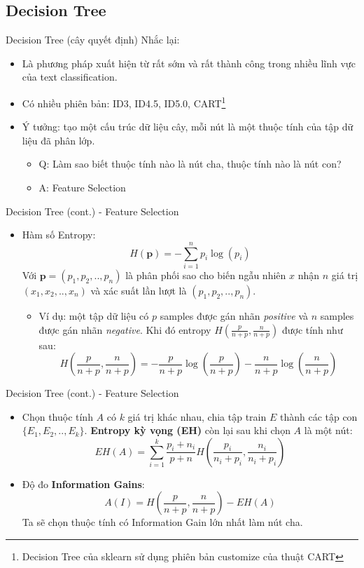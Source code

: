 \documentclass[aspectratio=169,xcolor=dvipsnames]{beamer}
\begin{document}
\subsection{Decision Tree}
\begin{frame}{Decision Tree (cây quyết định)}
Nhắc lại:
\begin{itemize}
\item Là phương pháp xuất hiện từ rất sớm và rất thành công trong nhiều lĩnh vực của text classification.
\item Có nhiều phiên bản: ID3, ID4.5, ID5.0, CART\footnote{Decision Tree của sklearn sử dụng phiên bản customize của thuật CART}
\item Ý tưởng: tạo một cấu trúc dữ liệu cây, mỗi nút là một thuộc tính của tập dữ liệu đã phân lớp.
\begin{itemize}
\item Q: Làm sao biết thuộc tính nào là nút cha, thuộc tính nào là nút con?
\item A: Feature Selection
\end{itemize}
\end{itemize}
\end{frame}

\begin{frame}{Decision Tree (cont.) - Feature Selection}
\begin{itemize}
\item Hàm số Entropy:
$$
H(\textbf{p}) = -\sum_{i = 1}^n p_i\log(p_i)
$$
Với $\textbf{p} = (p_1, p_2, .., p_n)$ là phân phối sao cho biến ngẫu nhiên $x$ nhận $n$ giá trị $(x_1, x_2, .., x_n)$ và xác suất lần lượt là $(p_1, p_2, .., p_n)$.

\begin{itemize}
\item Ví dụ: một tập dữ liệu có $p$ samples được gán nhãn \textit{positive} và $n$ samples được gán nhãn \textit{negative}. Khi đó entropy $H(\frac{p}{n + p}, \frac{n}{n + p})$ được tính như sau:
$$
H\left(\frac{p}{n + p}, \frac{n}{n + p}\right) = - \frac{p}{n + p}\log\left(\frac{p}{n + p}\right) - \frac{n}{n + p}\log\left(\frac{n}{n + p}\right)
$$
\end{itemize}
\end{itemize}
\end{frame}

\begin{frame}{Decision Tree (cont.) - Feature Selection}
\begin{itemize}
\item Chọn thuộc tính $A$ có $k$ giá trị khác nhau, chia tập train $E$ thành các tập con $\{E_1, E_2, .., E_k\}$. \textbf{Entropy kỳ vọng (EH)} còn lại sau khi chọn $A$ là một nút:
$$
EH(A) = \sum_{i = 1}^{k} \frac{p_i + n_i}{p + n} H\left(\frac{p_i}{n_i + p_i}, \frac{n_i}{n_i + p_i}\right)
$$
\item Độ đo \textbf{Information Gains}:
$$
A(I) = H\left(\frac{p}{n + p}, \frac{n}{n + p}\right) - EH(A)
$$
Ta sẽ chọn thuộc tính có Information Gain lớn nhất làm nút cha.
\end{itemize}
\end{frame}
\end{document}
